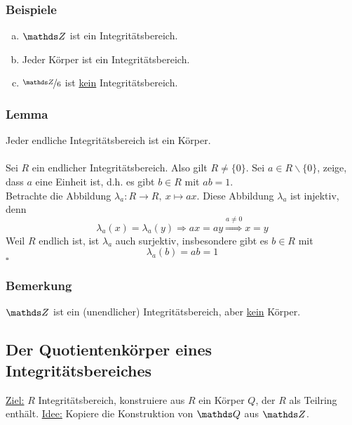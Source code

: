 \subsubsection*{Beispiele}
\begin{enumerate}[(a)]
	\item $\Z$ ist ein Integritätsbereich.
	\item Jeder Körper ist ein Integritätsbereich.
	\item $\nicefrac{\Z}{6}$ ist \uline{kein} Integritätsbereich.
\end{enumerate}

\subsubsection*{Lemma}
Jeder endliche Integritätsbereich ist ein Körper.\\

\\
Sei $R$ ein endlicher Integritätsbereich.
Also gilt $R\neq \{0\}$.
Sei $a\in R\backslash \{0\}$, zeige, dass $a$ eine Einheit ist, d.h. es gibt $b\in R$ mit $ab=1$.\\
Betrachte die Abbildung $\lambda_a:R\to R,~x\mapsto ax$.
Diese Abbildung $\lambda_a$ ist injektiv, denn 
\[
\lambda_a(x)=\lambda_a(y)\Rightarrow ax=ay\stackrel{a\neq 0}{\Rightarrow} x=y
\]
Weil $R$ endlich ist, ist $\lambda_a$ auch surjektiv, insbesondere gibt es $b\in R$ mit
\[
\lambda_a(b)=ab=1
\]
\hfill $\square$
\subsubsection*{Bemerkung}
$\Z$ ist ein (unendlicher) Integritätsbereich, aber \uline{kein} Körper.

\subsection{Der Quotientenkörper eines Integritätsbereiches}
\label{sub:quotientenkoeper}
\uline{Ziel:} $R$ Integritätsbereich, konstruiere aus $R$ ein Körper $Q$, der $R$ als Teilring enthält.
\uline{Idee:} Kopiere die Konstruktion von $\Q$ aus $\Z$.\\

